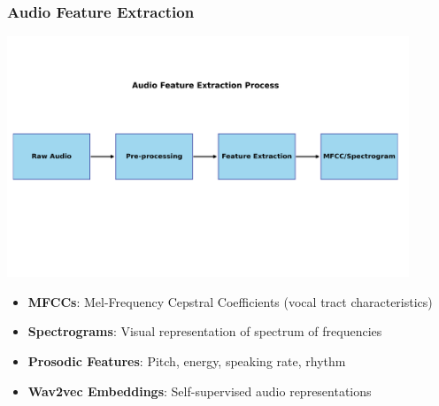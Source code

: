 \documentclass{beamer}
\begin{document}
\begin{frame}
\frametitle{Audio Feature Extraction}
\begin{center}
\includegraphics[width=0.9\textwidth]{figures/audio_feature_extraction.png}
\end{center}

\begin{itemize}
    \item \textbf{MFCCs}: Mel-Frequency Cepstral Coefficients (vocal tract characteristics)
    \item \textbf{Spectrograms}: Visual representation of spectrum of frequencies
    \item \textbf{Prosodic Features}: Pitch, energy, speaking rate, rhythm
    \item \textbf{Wav2vec Embeddings}: Self-supervised audio representations
\end{itemize}
\end{frame}
\end{document}
